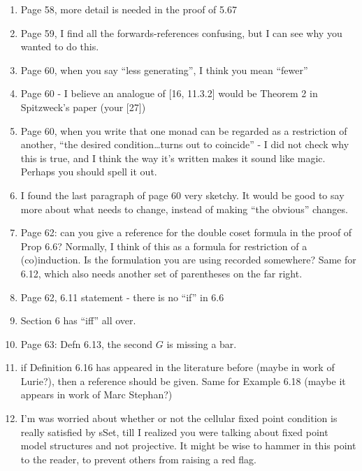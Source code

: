 \documentclass{article}
\begin{document}
\begin{enumerate}
	\item
	Page 58, more detail is needed in the proof of 5.67
	
	\item
	Page 59, I find all the forwards-references confusing, but I can see why you wanted to do this.
	
	\item
	Page 60, when you say ``less generating'', I think you mean ``fewer''
	
	\item
	Page 60 - I believe an analogue of [16, 11.3.2] would be Theorem 2 in Spitzweck's paper (your [27])
	
	\item
	Page 60, when you write that one monad can be regarded as a restriction of another, ``the desired condition\dots turns out to coincide'' - I did not check why this is true, and I think the way it's written makes it sound like magic. Perhaps you should spell it out.
	
	\item
	I found the last paragraph of page 60 very sketchy. It would be good to say more about what needs to change, instead of making ``the obvious'' changes.
	
	\item
	Page 62: can you give a reference for the double coset formula in the proof of Prop 6.6? Normally, I think of this as a formula for restriction of a (co)induction. Is the formulation you are using recorded somewhere?
	Same for 6.12, which also needs another set of parentheses on the far right.
	
	\item
	Page 62, 6.11 statement - there is no ``if'' in 6.6
	
	\item
	Section 6 has ``iff'' all over.
	
	\item
	Page 63: Defn 6.13, the second $G$ is missing a bar.
	
	
	\item if Definition 6.16 has appeared in the literature before (maybe in work of Lurie?), then a reference should be given. Same for Example 6.18 (maybe it appears in work of Marc Stephan?)
	
	\item I'm was worried about whether or not the cellular fixed point condition is really satisfied by sSet, till I realized you were talking about fixed point model structures and not projective. It might be wise to hammer in this point to the reader, to prevent others from raising a red flag.
	

\end{enumerate}
\end{document}
